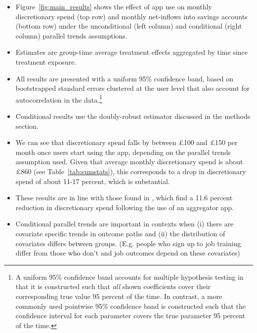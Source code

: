 \begin{itemize}

    \item Figure~\ref{fig:main_results} shows the effect of app use on monthly
        discretionary spend (top row) and monthly net-inflows into savings
        accounts (bottom row) under the unconditional (left column) and
        conditional (right column) parallel trends assumptions.

    \item Estimates are group-time average treatment effects aggregated by time
        since treatment exposure.

    \item All results are presented with a uniform 95\% confidence band, based
        on bootstrapped standard errors clustered at the user level that also
        account for autocorrelation in the data.\footnote{A uniform 95\%
            confidence band accounts for multiple hypothesis testing in that it
            is constructed such that \textit{all} shown coefficients cover
            their corresponding true value 95 percent of the time. In contrast,
            a more commonly used pointwise 95\% confidence band is constructed
        such that the confidence interval for each parameter covers the true
    parameter 95 percent of the time.}

    \item Conditional results use the doubly-robust estimator discussed in the
        methods section.

    \item We can see that discretionary spend falls by between \pounds100 and
        \pounds150 per month once users start using the app, depending on the
        parallel trends assumption used. Given that average
        monthly discretionary spend is about \pounds860 (see
        Table~\ref{tab:sumstats}), this corresponds to a drop in discretionary
        spend of about 11-17 percent, which is substantial.

    \item These results are in line with those found in \citet{levi2020mind},
        which find a 11.6 percent reduction in discretionary spend following
        the use of an aggregator app.

    \item Conditional parallel trends are important in contexts when (i) there
        are covariate specific trends in outcome paths and (ii) the
        distribution of covariates differs between groups. (E.g. people who
        sign up to job training differ from those who don't and job outcomes
        depend on these covariates)


\end{itemize}
